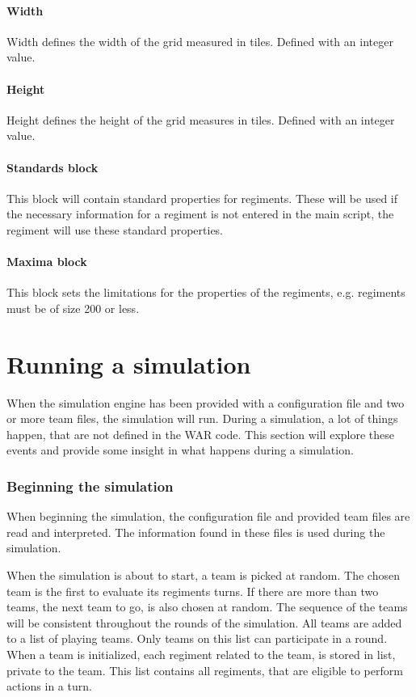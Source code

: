 		\paragraph{Width}
		Width defines the width of the grid measured in tiles.
		Defined with an integer value.
		
		\paragraph{Height}
		Height defines the height of the grid measures in tiles.
		Defined with an integer value.
		
		\paragraph{Standards block}
		This block will contain standard properties for regiments. These will be used if the necessary 
		information for a regiment is not entered in the main script, the regiment will use these standard properties.
		
		\paragraph{Maxima block}
		This block sets the limitations for the properties of the regiments, e.g. regiments must be of size 200 or less.

\section{Running a simulation}
	When the simulation engine has been provided with a configuration file and two or more team files, the simulation will run. During a simulation, a lot of things happen, that are not defined in the WAR code. This section will explore these events and provide some insight in what happens during a simulation.
	
		\subsubsection{Beginning the simulation}
		When beginning the simulation, the configuration file and provided team files are read and interpreted. The information found in these files is used during the simulation. 
		
When the simulation is about to start, a team is picked at random. The chosen team is the first to evaluate its regiments turns. If there are more than two teams, the next team to go, is also chosen at random. The sequence of the teams will be consistent throughout the rounds of the simulation. All teams are added to a list of playing teams. Only teams on this list can participate in a round. When a team is initialized, each regiment related to the team, is stored in list, private to the team. This list contains all regiments, that are eligible to perform actions in a turn. 

